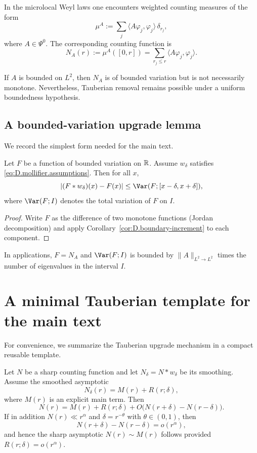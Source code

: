 In the microlocal Weyl laws one encounters weighted counting measures of the form
\[
\mu^A := \sum_j \langle A\varphi_j,\varphi_j\rangle\,\delta_{r_j},
\]
where $A\in\Psi^0$.
The corresponding counting function is
\[
N_A(r):=\mu^A([0,r])
=
\sum_{r_j\le r} \langle A\varphi_j,\varphi_j\rangle.
\]

If $A$ is bounded on $L^2$, then $N_A$ is of bounded variation but is not necessarily monotone.
Nevertheless, Tauberian removal remains possible under a uniform boundedness hypothesis.

\subsection{A bounded-variation upgrade lemma}
\label{subsec:D.bv}

We record the simplest form needed for the main text.

\begin{lemma}
\label{lem:D.bv-upgrade}
Let $F$ be a function of bounded variation on $\mathbb{R}$.
Assume $w_\delta$ satisfies \eqref{eq:D.mollifier.assumptions}.
Then for all $x$,
\[
|(F*w_\delta)(x)-F(x)|
\le
\Var(F;[x-\delta,x+\delta]),
\]
where $\Var(F;I)$ denotes the total variation of $F$ on $I$.
\end{lemma}

\begin{proof}
Write $F$ as the difference of two monotone functions (Jordan decomposition) and apply
Corollary~\ref{cor:D.boundary-increment} to each component.
\end{proof}

In applications, $F=N_A$ and $\Var(F;I)$ is bounded by $\|A\|_{L^2\to L^2}$ times the number of eigenvalues in the
interval $I$.

\section{A minimal Tauberian template for the main text}
\label{sec:D.template}

For convenience, we summarize the Tauberian upgrade mechanism in a compact reusable template.

\begin{proposition}
\label{prop:D.template}
Let $N$ be a sharp counting function and let $N_\delta=N*w_\delta$ be its smoothing.
Assume the smoothed asymptotic
\[
N_\delta(r)=M(r)+R(r;\delta),
\]
where $M(r)$ is an explicit main term.
Then
\[
N(r)=M(r)+R(r;\delta)+O\!\bigl(N(r+\delta)-N(r-\delta)\bigr).
\]
If in addition $N(r)\ll r^\alpha$ and $\delta=r^{-\theta}$ with $\theta\in(0,1)$, then
\[
N(r+\delta)-N(r-\delta)=o(r^\alpha),
\]
and hence the sharp asymptotic $N(r)\sim M(r)$ follows provided $R(r;\delta)=o(r^\alpha)$.
\end{proposition}


